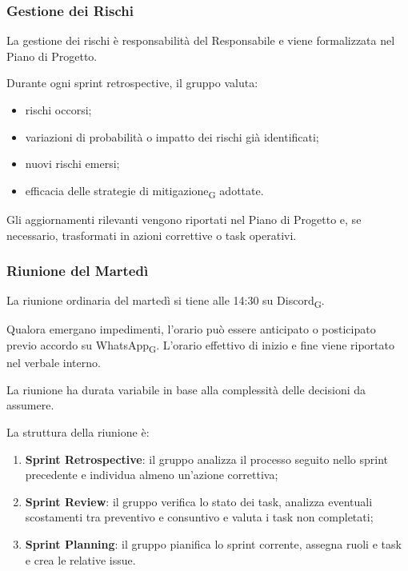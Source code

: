 \subsubsection{Gestione dei Rischi}

La gestione dei rischi è responsabilità del Responsabile e viene formalizzata nel
Piano di Progetto.

Durante ogni sprint retrospective, il gruppo valuta:
\begin{itemize}
    \item rischi occorsi;
    \item variazioni di probabilità o impatto dei rischi già identificati;
    \item nuovi rischi emersi;
    \item efficacia delle strategie di mitigazione\textsubscript{G} adottate.
\end{itemize}

Gli aggiornamenti rilevanti vengono riportati nel Piano di Progetto e, se
necessario, trasformati in azioni correttive o task operativi.


\subsubsection{Riunione del Martedì}

La riunione ordinaria del martedì si tiene alle 14:30 su Discord\textsubscript{G}.

Qualora emergano impedimenti, l'orario può essere anticipato o posticipato previo
accordo su WhatsApp\textsubscript{G}. L'orario effettivo di inizio e fine viene
riportato nel verbale interno.

La riunione ha durata variabile in base
alla complessità delle decisioni da assumere.

La struttura della riunione è:

\begin{enumerate}
    \item \textbf{Sprint Retrospective}: il gruppo analizza il processo seguito nello
    sprint precedente e individua almeno un'azione correttiva;

    \item \textbf{Sprint Review}: il gruppo verifica lo stato dei task, analizza
    eventuali scostamenti tra preventivo e consuntivo e valuta i task non completati;

    \item \textbf{Sprint Planning}: il gruppo pianifica lo sprint corrente, assegna
    ruoli e task e crea le relative issue.
\end{enumerate}

